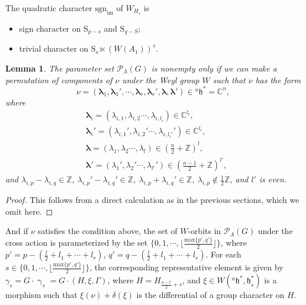 \documentclass[12pt, a4paper]{amsart}
\numberwithin{equation}{section}
\newtheorem{lem}[thm]{Lemma}
\newcommand{\blam}{{\boldsymbol{\lambda}}}
\newcommand{\BC}{{\mathbb {C}}}
\newcommand{\BZ}{{\mathbb {Z}}}
\newcommand{\CP}{{\mathcal {P}}}
\newcommand{\fh}{\mathfrak{h}}
\newcommand{\sgn}{{\mathrm{sgn}}}
\begin{document}
The quadratic character $\sgn_{\mathrm{im}}$ of $W_{H_{s}}$ is
\begin{itemize}
    \item sign character on $\mathrm{S}_{p-s}$ and $\mathrm{S}_{q-S}$;
    \item trivial character on $\mathrm{S}_s \ltimes  (W(A_1))^s$.
\end{itemize}


\begin{lem}
    The parameter set $\mathscr{P}_{\Lambda}(G)$ is nonempty only if we can make a permutation of components of $\nu$ under the Weyl group $W$ such that $\nu$ has the form
\begin{equation}
    \nu = (\blam_1, \blam_1', \cdots, \blam_r, \blam_r', \blam,\blam') \in {^{a}\fh}^* = \BC^n,
\end{equation}
where 
\begin{align}
    &\blam_i = (\lambda_{i,1}, \lambda_{i,2} \cdots , \lambda_{i,l_i} ) \in \BC^{l_i},\\
    &\blam_i' = (\lambda_{i,1}', \lambda_{i,2}' \cdots , \lambda_{i,l_i'}' ) \in \BC^{l_i},\\
    &\blam = (\lambda_{1}, \lambda_{2} \cdots , \lambda_{l} ) \in (\frac{n}{2}+ \BZ)^{l},\\
    &\blam' = (\lambda_{1}', \lambda_{2}' \cdots , \lambda_{l'}' ) \in (\frac{n-1}{2}+ \BZ)^{l'},
\end{align}
and $\lambda_{i,p} - \lambda_{i,q} \in \BZ$, $\lambda_{i,p}' - \lambda_{i,q}' \in \BZ$, $\lambda_{i,p} + \lambda_{i,q}' \in \BZ$, $\lambda_{i,p} \notin \frac{1}{2}\BZ$, and $l'$ is even. 
\end{lem}

\begin{proof}
    This follows from a direct calculation as in the previous sections, which we omit here.
\end{proof}




And if $\nu$ satisfies the condition above, the set of $W$-orbits in $\CP_{\Lambda}(G)$ under the cross action is parameterized by the set $\{0,1,\cdots,\lfloor \frac{\mathrm{max}\{p',q'\}}{2} \rfloor\}$, where $p' = p- (\frac{l}{2} + l_1 + \cdots + l_r )$, $q' = q - (\frac{l}{2} + l_1 + \cdots + l_r)$. For each $s \in \{0,1,\cdots,\lfloor \frac{\mathrm{max}\{p',q'\}}{2} \rfloor\}$, the corresponding representative element is given by $\gamma_s =G \cdot \upgamma_s = G \cdot (H, \xi, \Gamma)$, where $H = H_{\frac{n-l'}{2} + s}$, and $\xi \in W({^{a}\fh^*},\fh_s^*)$ is a morphism such that $\xi(\nu) + \delta(\xi)$ is the differential of a group character on $H$.
\end{document}
